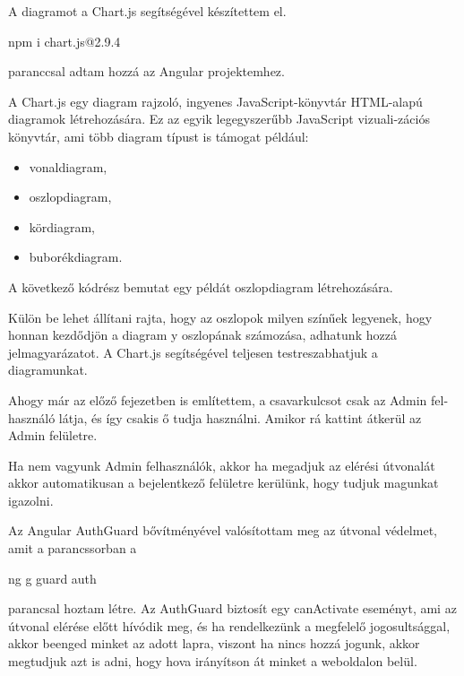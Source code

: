 A diagramot a Chart.js \cite{Chartjs} segítségével készítettem el. 
\begin{java}
npm i chart.js@2.9.4
\end{java}
paranccsal adtam hozzá az Angular projektemhez.

A Chart.js \cite{Chartjs2} egy diagram rajzoló, ingyenes JavaScript-könyvtár HTML-alapú diagramok létrehozására. Ez az egyik legegyszerűbb JavaScript vizuali-zációs könyvtár, ami több diagram típust is támogat például:

\begin{itemize}
\item vonaldiagram,
\item oszlopdiagram,
\item kördiagram,
\item buborékdiagram.
\end{itemize}

A következő kódrész bemutat egy példát oszlopdiagram létrehozására.

Külön be lehet állítani rajta, hogy az oszlopok milyen színűek legyenek, hogy honnan kezdődjön a diagram y oszlopának számozása, adhatunk hozzá jelmagyarázatot. A Chart.js segítségével teljesen testreszabhatjuk a diagramunkat.

Ahogy már az előző fejezetben is említettem, a csavarkulcsot csak az Admin fel-
használó látja, és így csakis ő tudja használni. Amikor rá kattint átkerül az Admin felületre.

Ha nem vagyunk Admin felhasználók, akkor ha megadjuk az elérési útvonalát akkor automatikusan a bejelentkező felületre kerülünk, hogy tudjuk magunkat igazolni.

Az Angular AuthGuard \cite{Authguard} bővítményével valósítottam meg az útvonal védelmet, amit a parancssorban a 
\begin{java}
ng g guard auth
\end{java}
parancsal hoztam létre.
Az AuthGuard biztosít egy canActivate eseményt, ami az útvonal elérése előtt hívódik meg, és ha rendelkezünk a megfelelő jogosultsággal, akkor beenged minket az adott lapra, viszont ha nincs hozzá jogunk, akkor megtudjuk azt is adni, hogy hova irányítson át minket a weboldalon belül.

